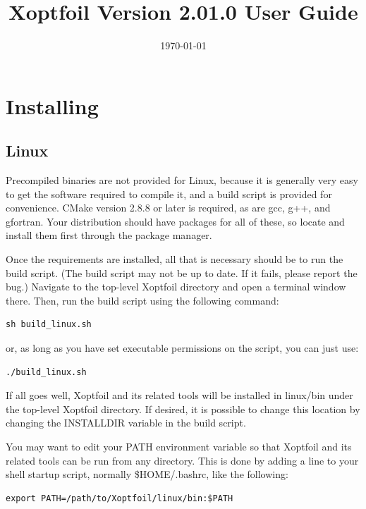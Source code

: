 \documentclass[11pt]{article}
\begin{document}
\title{Xoptfoil Version 2.01.0 User Guide}
\date{\today}
\maketitle

\tableofcontents

\section{Installing}\label{sec:installing}

\subsection{Linux}\label{sec:build_linux}

Precompiled binaries are not provided for Linux, because it is
generally very easy to get the software required to compile it, and a build script is
provided for convenience. CMake version 2.8.8 or later is required, as are gcc, g++, and
gfortran. Your distribution should have packages for all of these, so locate and install
them first through the package manager.

Once the requirements are installed, all that is necessary should be to run the build script. 
(The build script may not be up to date. If it fails, please report the bug.)
Navigate to the top-level Xoptfoil directory and open a terminal window there. Then, run
the build script using the following command:

\begin{verbatim}
sh build_linux.sh
\end{verbatim}

\noindent or, as long as you have set executable permissions on the script, you can just
use:

\begin{verbatim}
./build_linux.sh
\end{verbatim}

If all goes well, Xoptfoil and its related tools will be installed in linux/bin under the
top-level Xoptfoil directory. If desired, it is possible to change this location by
changing the INSTALLDIR variable in the build script.

You may want to edit your PATH environment variable so that Xoptfoil and its related tools
can be run from any directory. This is done by adding a line to your shell startup script,
normally \$HOME/.bashrc, like the following:

\begin{verbatim}
export PATH=/path/to/Xoptfoil/linux/bin:$PATH
\end{verbatim}
\end{document}
